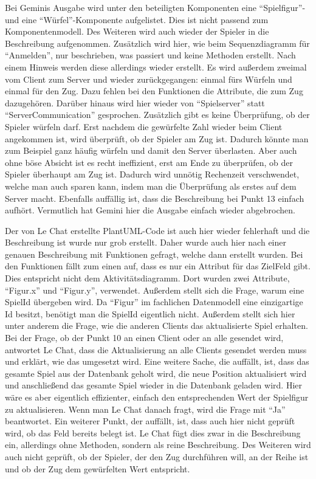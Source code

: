 Bei Geminis Ausgabe wird unter den beteiligten Komponenten eine ``Spielfigur''- und eine ``Würfel''-Komponente aufgelistet. Dies ist nicht 
passend zum Komponentenmodell. Des Weiteren wird auch wieder der Spieler in die Beschreibung aufgenommen. Zusätzlich wird hier, 
wie beim Sequenzdiagramm für ``Anmelden'', nur beschrieben, was passiert und keine Methoden erstellt. Nach einem Hinweis werden diese 
allerdings wieder erstellt. Es wird außerdem zweimal vom Client zum Server und wieder zurückgegangen: einmal fürs Würfeln und einmal 
für den Zug. Dazu fehlen bei den Funktionen die Attribute, die zum Zug dazugehören. Darüber hinaus wird hier wieder von ``Spielserver'' 
statt ``ServerCommunication'' gesprochen. Zusätzlich gibt es keine Überprüfung, ob der Spieler würfeln darf. Erst nachdem die gewürfelte 
Zahl wieder beim Client angekommen ist, wird überprüft, ob der Spieler am Zug ist. Dadurch könnte man zum Beispiel ganz häufig würfeln 
und damit den Server überlasten. Aber auch ohne böse Absicht ist es recht ineffizient, erst am Ende zu überprüfen, ob der Spieler 
überhaupt am Zug ist. Dadurch wird unnötig Rechenzeit verschwendet, welche man auch sparen kann, indem man die Überprüfung als erstes 
auf dem Server macht. Ebenfalls auffällig ist, dass die Beschreibung bei Punkt 13 einfach aufhört. Vermutlich hat Gemini hier die 
Ausgabe einfach wieder abgebrochen.

Der von Le Chat erstellte PlantUML-Code ist auch hier wieder fehlerhaft und die Beschreibung ist wurde nur grob erstellt. Daher wurde 
auch hier nach einer genauen Beschreibung mit Funktionen gefragt, welche dann erstellt wurden. Bei den Funktionen fällt zum einen auf, 
dass es nur ein Attribut für das ZielFeld gibt. Dies entspricht nicht dem Aktivitätsdiagramm. Dort wurden zwei Attribute, ``Figur.x'' 
und ``Figur.y'', verwendet. Außerdem stellt sich die Frage, warum eine SpielId übergeben wird. Da ``Figur'' im fachlichen Datenmodell eine 
einzigartige Id besitzt, benötigt man die SpielId eigentlich nicht. Außerdem stellt sich hier unter anderem die Frage, wie die anderen 
Clients das aktualisierte Spiel erhalten. Bei der Frage, ob der Punkt 10 an einen Client oder an alle gesendet wird, antwortet Le 
Chat, dass die Aktualisierung an alle Clients gesendet werden muss und erklärt, wie das umgesetzt wird. Eine weitere Sache, die 
auffällt, ist, dass das gesamte Spiel aus der Datenbank geholt wird, die neue Position aktualisiert wird und anschließend das gesamte 
Spiel wieder in die Datenbank geladen wird. Hier wäre es aber eigentlich effizienter, einfach den entsprechenden Wert der Spielfigur 
zu aktualisieren. Wenn man Le Chat danach fragt, wird die Frage mit ``Ja'' beantwortet. Ein weiterer Punkt, der auffällt, ist, dass auch 
hier nicht geprüft wird, ob das Feld bereits belegt ist. Le Chat fügt dies zwar in die Beschreibung ein, allerdings ohne Methoden, 
sondern als reine Beschreibung. Des Weiteren wird auch nicht geprüft, ob der Spieler, der den Zug durchführen will, an der Reihe ist 
und ob der Zug dem gewürfelten Wert entspricht.

